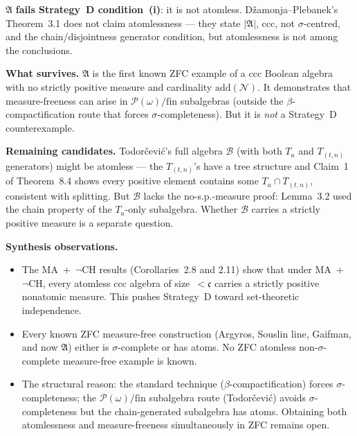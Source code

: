 \noindent
$\mathfrak{A}$ \textbf{fails Strategy~D condition~(i)}: it is not
atomless.  D\v{z}amonja--Plebanek's Theorem~3.1 does not claim
atomlessness --- they state $|\mathfrak{A}|$, ccc, not
$\sigma$-centred, and the chain/disjointness generator condition,
but atomlessness is not among the conclusions.

\medskip\noindent
\textbf{What survives.}  $\mathfrak{A}$ is the first known ZFC
example of a ccc Boolean algebra with no strictly positive measure
and cardinality $\mathrm{add}(\mathcal{N})$.  It demonstrates that
measure-freeness can arise in $\mathcal{P}(\omega)/\mathrm{fin}$
subalgebras (outside the $\beta$-compactification route that forces
$\sigma$-completeness).  But it is \emph{not} a Strategy~D
counterexample.

\medskip\noindent
\textbf{Remaining candidates.}  Todor\v{c}evi\'{c}'s full algebra
$\mathcal{B}$ (with both $T_a$ and $T_{(t,n)}$ generators) might be
atomless --- the $T_{(t,n)}$'s have a tree structure and Claim~1 of
Theorem~8.4 shows every positive element contains some $T_a \cap
T_{(t,n)}$, consistent with splitting.  But $\mathcal{B}$ lacks the
no-s.p.-measure proof: Lemma~3.2 used the chain property of the
$T_a$-only subalgebra.  Whether $\mathcal{B}$ carries a strictly
positive measure is a separate question.

\medskip\noindent
\textbf{Synthesis observations.}
\begin{itemize}[nosep]
  \item The MA~+~$\neg$CH results (Corollaries~2.8 and 2.11) show
    that under MA~+~$\neg$CH, every atomless ccc algebra of
    size~$< \mathfrak{c}$ carries a strictly positive nonatomic
    measure.  This pushes Strategy~D toward set-theoretic
    independence.

  \item Every known ZFC measure-free construction (Argyros, Souslin
    line, Gaifman, and now $\mathfrak{A}$) either is
    $\sigma$-complete or has atoms.  No ZFC atomless
    non-$\sigma$-complete measure-free example is known.

  \item The structural reason: the standard technique
    ($\beta$-compactification) forces $\sigma$-completeness;
    the $\mathcal{P}(\omega)/\mathrm{fin}$ subalgebra route
    (Todor\v{c}evi\'{c}) avoids $\sigma$-completeness but the
    chain-generated subalgebra has atoms.  Obtaining both
    atomlessness and measure-freeness simultaneously in ZFC
    remains open.
\end{itemize}

